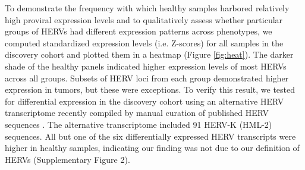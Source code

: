 To demonstrate the frequency with which healthy samples harbored relatively high proviral expression levels and to qualitatively assess whether particular groups of HERVs had different expression patterns across phenotypes, we computed standardized expression levels (i.e. Z-scores) for all samples in the discovery cohort and plotted them in a heatmap (Figure \ref{fig:heat}).
The darker shade of the healthy panels indicated higher expression levels of most HERVs across all groups.
Subsets of HERV loci from each group demonstrated higher expression in tumors, but these were exceptions.
To verify this result, we tested for differential expression in the discovery cohort using an alternative HERV transcriptome recently compiled by manual curation of published HERV sequences \citep{Grabski2020}.
The alternative transcriptome included 91 HERV-K (HML-2) sequences.
All but one of the six differentially expressed HERV transcripts were higher in healthy samples, indicating our finding was not due to our definition of HERVs (Supplementary Figure 2).
